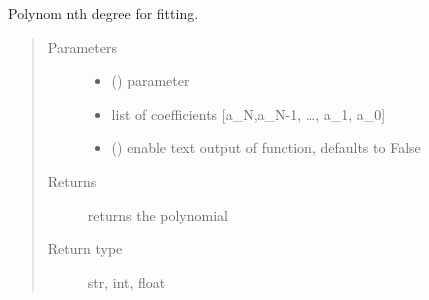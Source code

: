 \documentclass[letterpaper,10pt,english]{sphinxmanual}
\begin{document}
\begin{fulllineitems}
\label{\detokenize{fit-functions:fit_functions.poly}}
Polynom nth degree for fitting.
\begin{quote}\begin{description}
\item[{Parameters}] \leavevmode\begin{itemize}
\item {} 
 (\sphinxstyleliteralemphasis{\sphinxupquote{, }}) \textendash{} parameter

\item {} 
 \textendash{} 
list of coefficients {[}a\_N,a\_N-1, …, a\_1, a\_0{]}


\item {} 
 (\sphinxstyleliteralemphasis{\sphinxupquote{, }}) \textendash{} enable text output of function, defaults to False

\end{itemize}

\item[{Returns}] \leavevmode
returns the polynomial

\item[{Return type}] \leavevmode
str, int, float

\end{description}\end{quote}

\begin{sphinxVerbatim}[commandchars=\\\{\}]
  
\end{sphinxVerbatim}

\begin{sphinxVerbatim}[commandchars=\\\{\}]
 
\end{sphinxVerbatim}

\end{fulllineitems}
\end{document}
